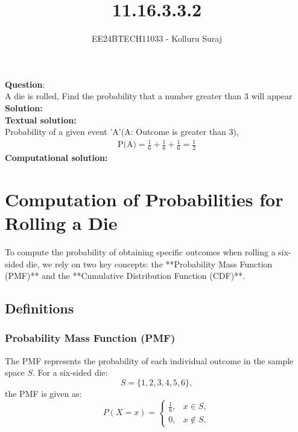 \documentclass[journal]{IEEEtran}
\begin{document}
	
	
	\vspace{3cm}
	
	\title{11.16.3.3.2}
	\author{EE24BTECH11033 - Kolluru Suraj }
	{\let\newpage\relax\maketitle}
	
	\renewcommand{\thefigure}{\theenumi}
	\renewcommand{\thetable}{\theenumi}
	\setlength{\intextsep}{10pt} %
	
	
	\renewcommand{\thetable}{\theenumi}
	
	
\textbf{Question}:\\
A die is rolled, Find the probability that a number greater than 3 will appear \\
\textbf{Solution: }\\
\textbf{Textual solution: }\\
Probability of a given event 'A'(A: Outcome is greater than 3),\\
\begin{align}
    \text{P(A)}=\frac{1}{6}+\frac{1}{6}+\frac{1}{6}=\frac{1}{2}
\end{align}
\textbf{Computational solution: }\\



\section*{Computation of Probabilities for Rolling a Die}

To compute the probability of obtaining specific outcomes when rolling a six-sided die, we rely on two key concepts: the **Probability Mass Function (PMF)** and the **Cumulative Distribution Function (CDF)**.

\subsection*{Definitions}
\subsubsection*{Probability Mass Function (PMF)}
The PMF represents the probability of each individual outcome in the sample space \( S \). For a six-sided die:
\[
S = \{1, 2, 3, 4, 5, 6\},
\]
the PMF is given as:
\[
P(X = x) = 
\begin{cases} 
\frac{1}{6}, & x \in S, \\ 
0, & x \notin S.
\end{cases}
\]
\end{document}
